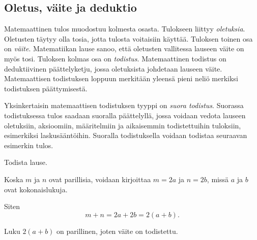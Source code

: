 
\subsection*{Oletus, väite ja deduktio}

Matemaattinen tulos muodostuu kolmesta osasta. Tulokseen liittyy {\em oletuksia}. Oletusten täytyy olla tosia, jotta tulosta voitaisiin käyttää. Tuloksen toinen osa on {\em väite}. Matematiikan lause sanoo, että oletusten vallitessa lauseen väite on myös tosi. Tuloksen kolmas osa on {\em todistus}. Matemaattinen todistus on deduktiivinen päättelyketju, jossa oletuksista johdetaan lauseen väite. Matemaattisen todistuksen loppuun merkitään yleensä pieni neliö merkiksi todistuksen päättymisestä.

Yksinkertaisin matemaattisen todistuksen tyyppi on {\em suora todistus}. Suorassa todistuksessa tulos saadaan suoralla päättelyllä, jossa voidaan vedota lauseen oletuksiin, aksioomiin, määritelmiin ja aikaisemmin todistettuihin tuloksiin, esimerkiksi laskusääntöihin. Suoralla todistuksella voidaan todistaa seuraavan esimerkin tulos.

\begin{esimerkki}
 Todista lause.


\begin{todistus}
Koska $m$ ja $n$ ovat parillisia, voidaan kirjoittaa $m=2a$ ja $n=2b$, missä $a$ ja $b$ ovat kokonaislukuja.

Siten
\[
m+n =2a+2b = 2(a+b).
\]

Luku $2(a+b)$ on parillinen, joten väite on todistettu.
\end{todistus}
\end{esimerkki}

